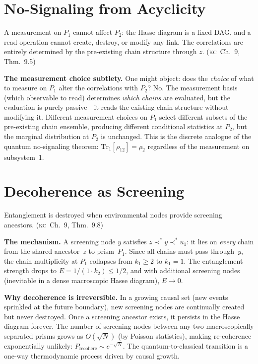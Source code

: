 \documentclass[11pt, a4paper, openany]{book}
\newcommand{\covers}{\prec^*}              %
\newcommand{\KC}[1]{\textnormal{(\textsc{kc}~#1)}}
\newcounter{thm}[chapter]
\begin{document}
\section{No-Signaling from Acyclicity}\label{sec:no-signaling}

\begin{theorem}[No-Signaling]\label{thm:no-signaling}
A measurement on $P_1$ cannot affect $P_2$: the Hasse diagram is a
fixed DAG, and a read operation cannot create, destroy, or modify any
link. The correlations are entirely determined by the pre-existing chain
structure through $z$. \KC{Ch.~9, Thm.~9.5}
\end{theorem}

\noindent
\textbf{The measurement choice subtlety.} One might object: does the
\emph{choice} of what to measure on $P_1$ alter the correlations with
$P_2$? No. The measurement basis (which observable to read) determines
\emph{which chains} are evaluated, but the evaluation is purely
passive---it reads the existing chain structure without modifying it.
Different measurement choices on $P_1$ select different subsets of
the pre-existing chain ensemble, producing different conditional
statistics at $P_2$, but the marginal distribution at $P_2$ is
unchanged. This is the discrete analogue of the quantum no-signaling
theorem: $\mathrm{Tr}_1[\rho_{12}] = \rho_2$ regardless of the
measurement on subsystem~1.

\section{Decoherence as Screening}\label{sec:decoherence}

\begin{theorem}[Decoherence]\label{thm:decoherence}
Entanglement is destroyed when environmental nodes provide screening
ancestors. \KC{Ch.~9, Thm.~9.8}
\end{theorem}

\noindent
\textbf{The mechanism.} A screening node $y$ satisfies
$z \covers y \covers u_1$: it lies on \emph{every} chain from the
shared ancestor~$z$ to prism~$P_1$. Since all chains must pass
through~$y$, the chain multiplicity at $P_1$ collapses from
$k_1 \ge 2$ to $k_1 = 1$. The entanglement strength drops to
$E = 1/(1 \cdot k_2) \le 1/2$, and with additional screening nodes
(inevitable in a dense macroscopic Hasse diagram), $E \to 0$.

\textbf{Why decoherence is irreversible.} In a growing causal set
(new events sprinkled at the future boundary), new screening nodes
are continually created but never destroyed. Once a screening ancestor
exists, it persists in the Hasse diagram forever. The number of
screening nodes between any two macroscopically separated prisms grows
as $O(\sqrt{N})$ (by Poisson statistics), making re-coherence
exponentially unlikely: $P_{\mathrm{recohere}} \sim e^{-\sqrt{N}}$.
The quantum-to-classical transition is a one-way thermodynamic process
driven by causal growth.
\end{document}
